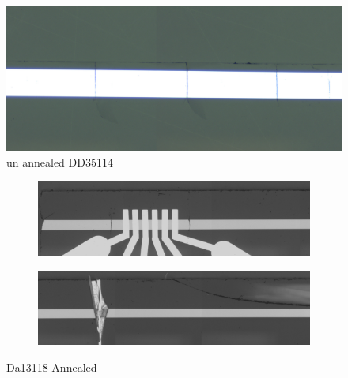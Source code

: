 \begin{figure}
    \centering
    \includegraphics[width=\textwidth]{fig/polishing/dd354114_8.jpg}
    \caption{un annealed DD35114}
    \label{fig:my_label}
\end{figure}



\begin{figure}[h]
\centering
\begin{subfigure}{\textwidth}
  \centering
  \includegraphics[width=\linewidth]{fig/OA/e944190422_redo-dup1.jpg}
  \label{fig:sfig1}
\end{subfigure}%

\begin{subfigure}{\textwidth}
  \centering
  \includegraphics[width=\linewidth]{fig/OA/e944190422_redo-duplicate2.jpg}
  \label{fig:sfig2}
\end{subfigure}%

\caption{Da13118 Annealed }
\label{fig:si_sige}
\end{figure}


